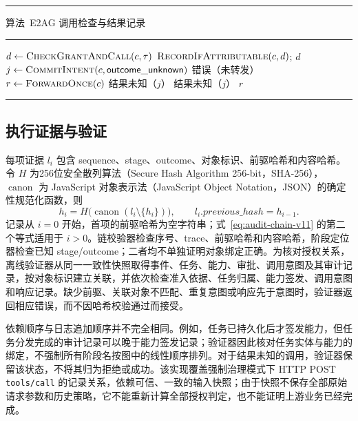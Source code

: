 \noindent\begin{minipage}{\linewidth}
\noindent\rule{\linewidth}{0.6pt}
\label{alg:e2ag-call-rr022}
{\centering 算法~\thealgorithm\quad E2AG 调用检查与结果记录\par}
\vspace{-0.5\baselineskip}
\noindent\rule{\linewidth}{0.4pt}
\begin{algorithmic}[1]
  \State $d\gets\Call{CheckGrantAndCall}{c,\tau}$
    \State $\Call{RecordIfAttributable}{c,d}$; \Return $d$
  \EndIf
  \State $j\gets\Call{CommitIntent}{c,\mathsf{outcome\_unknown}}$
   \State \Return 错误（未转发） \EndIf
  \State $r\gets\Call{ForwardOnce}{c}$
   \State \Return 结果未知（$j$） \EndIf
    \State \Return 结果未知（$j$）
  \EndIf
  \State \Return $r$
\EndProcedure
\end{algorithmic}
\noindent\rule{\linewidth}{0.6pt}
\end{minipage}
\par\addvspace{\intextsep}

\subsection{执行证据与验证}

每项证据 $l_i$ 包含 sequence、stage、outcome、对象标识、前驱哈希和内容哈希。令 $H$ 为256位安全散列算法（Secure Hash Algorithm 256-bit，SHA-256），$\operatorname{canon}$ 为 JavaScript 对象表示法（JavaScript Object Notation，JSON）的确定性规范化函数，则
\begin{equation}
h_i=H\bigl(\operatorname{canon}(l_i\setminus\{h_i\})\bigr),\qquad
l_i.previous\_hash=h_{i-1}.
\label{eq:audit-chain-v11}
\end{equation}
记录从 $i=0$ 开始，首项的前驱哈希为空字符串；式~\eqref{eq:audit-chain-v11} 的第二个等式适用于 $i>0$。链校验器检查序号、trace、前驱哈希和内容哈希，阶段定位器检查已知 stage/outcome；二者均不单独证明对象绑定正确。为核对授权关系，离线验证器从同一一致性快照取得事件、任务、能力、审批、调用意图及其审计记录，按对象标识建立关联，并依次检查准入依据、任务归属、能力签发、调用意图和响应记录。缺少前驱、关联对象不匹配、重复意图或响应先于意图时，验证器返回相应错误，而不因哈希校验通过而接受。

依赖顺序与日志追加顺序并不完全相同。例如，任务已持久化后才签发能力，但任务分发完成的审计记录可以晚于能力签发记录；验证器因此核对任务实体与能力的绑定，不强制所有阶段名按图中的线性顺序排列。对于结果未知的调用，验证器保留该状态，不将其归为拒绝或成功。该实现覆盖强制治理模式下 HTTP POST \texttt{tools/call} 的记录关系，依赖可信、一致的输入快照；由于快照不保存全部原始请求参数和历史策略，它不能重新计算全部授权判定，也不能证明上游业务已经完成。

